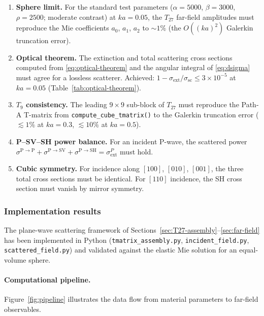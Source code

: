 \begin{enumerate}[label=(V\arabic*)]
\item \textbf{Sphere limit.}  For the standard test parameters
  ($\alpha = 5000$, $\beta = 3000$, $\rho = 2500$; moderate contrast)
  at $ka = 0.05$, the $T_{27}$ far-field
  amplitudes must reproduce the Mie coefficients $a_0$, $a_1$, $a_2$ to
  $\sim\!1\%$ (the $O((ka)^2)$ Galerkin truncation error).
\item \textbf{Optical theorem.}  The extinction and total scattering
  cross sections computed from \eqref{eq:optical-theorem} and the
  angular integral of \eqref{eq:dsigma} must agree for a lossless
  scatterer. Achieved: $1 - \sigma_{\mathrm{ext}}/\sigma_{\mathrm{sc}}
  \le 3\times10^{-5}$ at $ka = 0.05$ (Table~\ref{tab:optical-theorem}).
\item \textbf{$T_9$ consistency.}  The leading $9 \times 9$ sub-block
  of $T_{27}$ must reproduce the Path-A T-matrix from
  \texttt{compute\_cube\_tmatrix()} to the Galerkin truncation error
  ($\lesssim 1\%$ at $ka = 0.3$, $\lesssim 10\%$ at $ka = 0.5$).
\item \textbf{P--SV--SH power balance.}  For an incident P-wave, the
  scattered power $\sigma^{\mathrm{P\to P}} + \sigma^{\mathrm{P\to SV}}
  + \sigma^{\mathrm{P\to SH}} = \sigma_{\mathrm{ext}}^P$ must hold.
\item \textbf{Cubic symmetry.}  For incidence along $[100]$, $[010]$,
  $[001]$, the three total cross sections must be identical.  For $[110]$
  incidence, the SH cross section must vanish by mirror symmetry.
\end{enumerate}

\subsubsection{Implementation results}
\label{sec:phase1-results}

The plane-wave scattering framework of Sections~\ref{sec:T27-assembly}--\ref{sec:far-field}
has been implemented in Python (\texttt{tmatrix\_assembly.py},
\texttt{incident\_field.py}, \texttt{scattered\_field.py}) and validated
against the elastic Mie solution for an equal-volume sphere.

\paragraph{Computational pipeline.}
Figure~\ref{fig:pipeline} illustrates the data flow from material parameters
to far-field observables.

